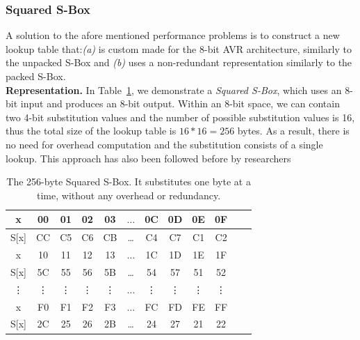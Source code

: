 \documentclass[11pt]{article}
\begin{document}
\subsubsection{Squared S-Box}\label{ssbox}
A solution to the afore mentioned performance problems is to construct a new lookup table that:\emph{(a)} is custom made for the 8-bit AVR architecture, similarly to the unpacked S-Box and \emph{(b)} uses a non-redundant representation similarly to the packed S-Box.\\
\textbf{Representation.} In Table~\ref{squared_sbox}, we demonstrate a \emph{Squared S-Box}, which uses an 8-bit input and produces an 8-bit output. Within an 8-bit space, we can contain two 4-bit substitution values and the number of possible substitution values is 16, thus the total size of the lookup table is $16*16=256$ bytes. As a result, there is no need for overhead computation and the substitution consists of a single lookup. This approach has also been followed before by researchers~\cite{eisenbarth2012compact}\\
\begin{table}[h]
\footnotesize
\centering
\begin{tabular}{| c | c  | c | c | c  | c  | c | c | c  | c | c | c |}
\hline
  x & 00 & 01 & 02 & 03  &  $\dots$  & 0C & 0D & 0E & 0F   \\
\hline
 S[x] & CC & C5 & C6 & CB & \dots & C4 & C7 & C1 & C2   \\
\hline
  x & 10 & 11 & 12 & 13  &  $\dots$  & 1C & 1D & 1E & 1F   \\
\hline
 S[x] & 5C & 55 & 56 & 5B & \dots & 54 & 57 & 51 & 52   \\
\hline
  \vdots & \vdots & \vdots & \vdots & \vdots  &  $\dots$  & \vdots &\vdots & \vdots & \vdots   \\
\hline
  x & F0 & F1 & F2 & F3  &  $\dots$  & FC & FD & FE & FF   \\
\hline
 S[x] & 2C & 25 & 26 & 2B & \dots & 24 & 27 & 21 & 22   \\


\hline
\end{tabular}
 \caption{\footnotesize The 256-byte Squared S-Box. It substitutes one byte at a time, without any overhead or redundancy.}
 \label{squared_sbox}
\end{table}
\end{document}
